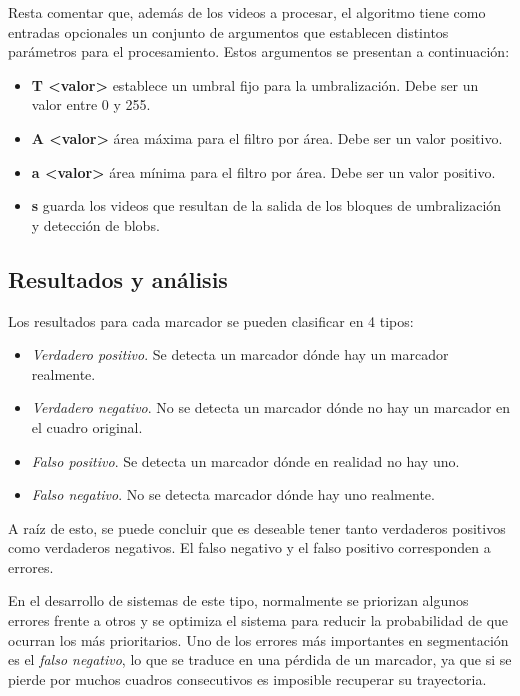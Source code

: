  Resta comentar que, además de los videos a procesar, el algoritmo tiene como entradas opcionales un conjunto de argumentos que establecen distintos parámetros para el procesamiento. Estos argumentos se presentan a continuación:

 \begin{itemize}
\item \textbf{T <valor>} establece un umbral fijo para la umbralización. Debe ser un valor entre 0 y 255.
\item \textbf{A <valor>} área máxima para el filtro por área. Debe ser un valor positivo.
\item \textbf{a <valor>} área mínima para el filtro por área. Debe ser un valor positivo.
\item \textbf{s} guarda los videos que resultan de la salida de los bloques de umbralización y detección de blobs.
 \end{itemize}

\subsection{Resultados y análisis}
\label{resultadosyanalisissegmentacion}
Los resultados para cada marcador se pueden clasificar en 4 tipos:
\begin{itemize}
\item \textit{Verdadero positivo}. Se detecta un marcador dónde hay un marcador realmente.
\item \textit{Verdadero negativo}. No se detecta un marcador dónde no hay un marcador en el cuadro original.
\item \textit{Falso positivo}. Se detecta un marcador dónde en realidad no hay uno.
\item \textit{Falso negativo}. No se detecta marcador dónde hay uno realmente.
\end{itemize}


A raíz de esto, se puede concluir que es deseable tener tanto verdaderos positivos como verdaderos negativos. El falso negativo y el falso positivo corresponden a errores. 

En el desarrollo de sistemas de este tipo, normalmente se priorizan algunos errores frente a otros y se optimiza el sistema para reducir la probabilidad de que ocurran los más prioritarios. Uno de los errores más importantes en segmentación es el \textit{falso negativo}, lo que se traduce en una pérdida de un marcador, ya que si se pierde por muchos cuadros consecutivos es imposible recuperar su trayectoria. 

